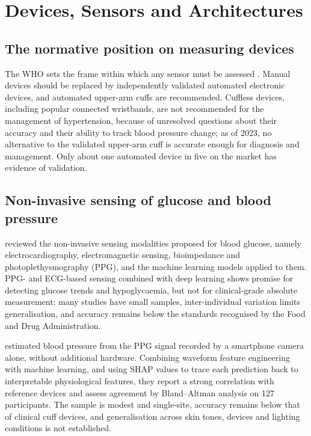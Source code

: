 \documentclass[11pt,a4paper,oneside]{report}
\begin{document}
\section{Devices, Sensors and Architectures}\label{sec:lr-iot}

\subsection{The normative position on measuring devices}\label{sec:metrology}

The WHO sets the frame within which any sensor must be assessed \parencite{who2023hypertension}. Manual devices should be replaced by independently validated automated electronic devices, and automated upper-arm cuffs are recommended. Cuffless devices, including popular connected wristbands, are not recommended for the management of hypertension, because of unresolved questions about their accuracy and their ability to track blood pressure change; as of 2023, no alternative to the validated upper-arm cuff is accurate enough for diagnosis and management. Only about one automated device in five on the market has evidence of validation.

\subsection{Non-invasive sensing of glucose and blood pressure}\label{sec:cuffless}

\Textcite{alhaddad2022} reviewed the non-invasive sensing modalities proposed for blood glucose, namely electrocardiography, electromagnetic sensing, bioimpedance and photoplethysmography (PPG), and the machine learning models applied to them. PPG- and ECG-based sensing combined with deep learning shows promise for detecting glucose trends and hypoglycaemia, but not for clinical-grade absolute measurement: many studies have small samples, inter-individual variation limits generalisation, and accuracy remains below the standards recognised by the Food and Drug Administration.

\Textcite{liu2025ppg} estimated blood pressure from the PPG signal recorded by a smartphone camera alone, without additional hardware. Combining waveform feature engineering with machine learning, and using SHAP values to trace each prediction back to interpretable physiological features, they report a strong correlation with reference devices and assess agreement by Bland--Altman analysis on 127 participants. The sample is modest and single-site, accuracy remains below that of clinical cuff devices, and generalisation across skin tones, devices and lighting conditions is not established.
\end{document}
